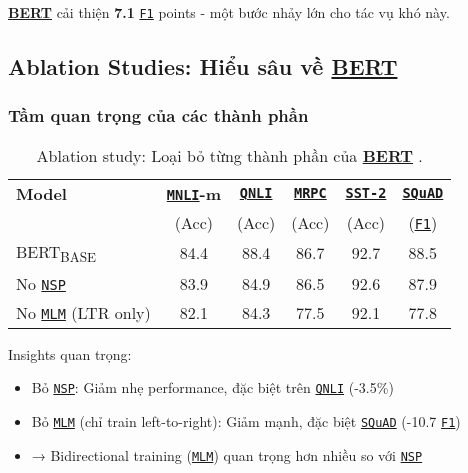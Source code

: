 \hyperref[acro:bert]{\textbf{BERT}} cải thiện \textbf{7.1} \hyperref[acro:f1]{\texttt{F1}} points - một bước nhảy lớn cho tác vụ khó này.

\subsection{Ablation Studies: Hiểu sâu về \hyperref[acro:bert]{\textbf{BERT}}}
\label{ssec:ablation_study_bert}

\subsubsection{Tầm quan trọng của các thành phần}
\begin{table}[H]
    \centering
    \caption{Ablation study: Loại bỏ từng thành phần của \hyperref[acro:bert]{\textbf{BERT}} \cite{devlin2018bert}.}
    \label{tab:ablation_components}
    \begin{tabular}{lccccc}
        \toprule
        \textbf{Model} & \textbf{\hyperref[acro:mnli]{\texttt{MNLI}}-m} & \textbf{\hyperref[acro:qnli]{\texttt{QNLI}}} & \textbf{\hyperref[acro:mrpc]{\texttt{MRPC}}} & \textbf{\hyperref[acro:sst2]{\texttt{SST-2}}} & \textbf{\hyperref[acro:squad]{\texttt{SQuAD}}} \\
        & (Acc) & (Acc) & (Acc) & (Acc) & (\hyperref[acro:f1]{\texttt{F1}}) \\
        \midrule
        BERT\textsubscript{BASE} & 84.4 & 88.4 & 86.7 & 92.7 & 88.5 \\
        \midrule
        No \hyperref[acro:nsp]{\texttt{NSP}} & 83.9 & 84.9 & 86.5 & 92.6 & 87.9 \\
        No \hyperref[acro:mlm]{\texttt{MLM}} (LTR only) & 82.1 & 84.3 & 77.5 & 92.1 & 77.8 \\
        \bottomrule
    \end{tabular}
\end{table}

Insights quan trọng:
\begin{itemize}
    \item Bỏ \hyperref[acro:nsp]{\texttt{NSP}}: Giảm nhẹ performance, đặc biệt trên \hyperref[acro:qnli]{\texttt{QNLI}} (-3.5\%)
    \item Bỏ \hyperref[acro:mlm]{\texttt{MLM}} (chỉ train left-to-right): Giảm mạnh, đặc biệt \hyperref[acro:squad]{\texttt{SQuAD}} (-10.7 \hyperref[acro:f1]{\texttt{F1}})
    \item → Bidirectional training (\hyperref[acro:mlm]{\texttt{MLM}}) quan trọng hơn nhiều so với \hyperref[acro:nsp]{\texttt{NSP}}
\end{itemize}


